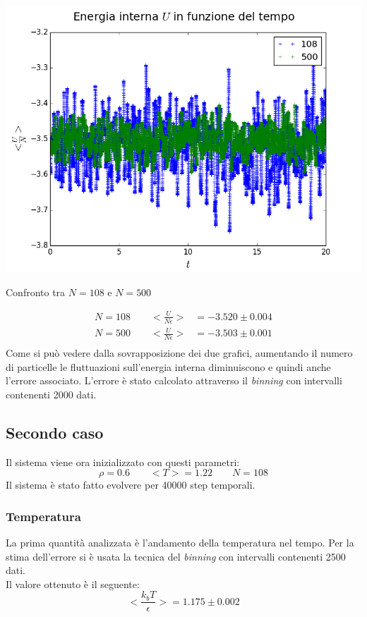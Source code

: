 \begin{myfig}[h]
	\includegraphics[scale=0.5]{soft_core/9cfr.png}
	\caption{Confronto tra $N=108$ e $N=500$}
\end{myfig}

\begin{align}
N=108 \qquad <\frac{U}{N \epsilon}> &= -3.520 \pm 0.004 \\
N=500 \qquad <\frac{U}{N \epsilon}> &= -3.503 \pm 0.001 \\
\end{align}
Come si può vedere dalla sovrapposizione dei due grafici, aumentando il numero di particelle le fluttuazioni sull'energia interna diminuiscono e quindi anche l'errore associato.
L'errore è stato calcolato attraverso il \emph{binning} con intervalli contenenti 2000 dati.

\subsection{Secondo caso}
Il sistema viene ora inizializzato con questi parametri:
$$
	\rho = 0.6 \qquad <T> = 1.22 \qquad N=108
$$
Il sistema è stato fatto evolvere per 40000 step temporali.\\
\subsubsection{Temperatura}
La prima quantità analizzata è l'andamento della temperatura nel tempo. Per la stima dell'errore si è usata la tecnica del \emph{binning} con intervalli contenenti 2500 dati.\\
Il valore ottenuto è il seguente:
$$
		<\frac{k_b T}{\epsilon}> = 1.175 \pm 0.002
$$


